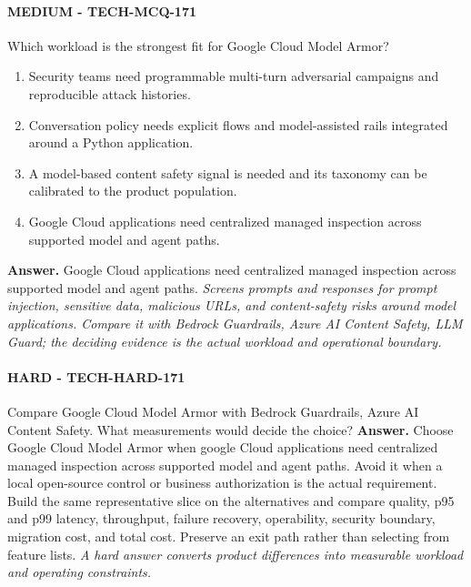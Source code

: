 \paragraph{MEDIUM - TECH-MCQ-171} Which workload is the strongest fit for Google Cloud Model Armor?
\begin{enumerate}[label=\Alph*.]
\item Security teams need programmable multi-turn adversarial campaigns and reproducible attack histories.
\item Conversation policy needs explicit flows and model-assisted rails integrated around a Python application.
\item A model-based content safety signal is needed and its taxonomy can be calibrated to the product population.
\item Google Cloud applications need centralized managed inspection across supported model and agent paths.
\end{enumerate}
\textbf{Answer.} Google Cloud applications need centralized managed inspection across supported model and agent paths.
\textit{Screens prompts and responses for prompt injection, sensitive data, malicious URLs, and content-safety risks around model applications. Compare it with Bedrock Guardrails, Azure AI Content Safety, LLM Guard; the deciding evidence is the actual workload and operational boundary.}
\paragraph{HARD - TECH-HARD-171} Compare Google Cloud Model Armor with Bedrock Guardrails, Azure AI Content Safety. What measurements would decide the choice?
\textbf{Answer.} Choose Google Cloud Model Armor when google Cloud applications need centralized managed inspection across supported model and agent paths. Avoid it when a local open-source control or business authorization is the actual requirement. Build the same representative slice on the alternatives and compare quality, p95 and p99 latency, throughput, failure recovery, operability, security boundary, migration cost, and total cost. Preserve an exit path rather than selecting from feature lists.
\textit{A hard answer converts product differences into measurable workload and operating constraints.}
